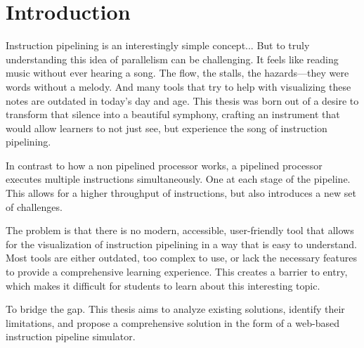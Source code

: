 \chapter{Introduction}


Instruction pipelining is an interestingly simple concept... But to truly understanding this idea of parallelism can be challenging. It feels like reading music without ever hearing a song. The flow, the stalls, the hazards—they were words without a melody. And many tools that try to help with visualizing these notes are outdated in today's day and age.
This thesis was born out of a desire to transform that silence into a beautiful symphony, crafting an instrument that would allow learners to not just see, but experience the song of instruction pipelining.

In contrast to how a non pipelined processor works, a pipelined processor executes multiple instructions simultaneously. One at each stage of the pipeline. This allows for a higher throughput of instructions, but also introduces a new set of challenges.

The problem is that there is no modern, accessible, user-friendly tool that allows for the visualization of instruction pipelining in a way that is easy to understand. Most tools are either outdated, too complex to use, or lack the necessary features to provide a comprehensive learning experience. This creates a barrier to entry, which makes it difficult for students to learn about this interesting topic.

To bridge the gap. This thesis aims to analyze existing solutions, identify their limitations, and propose a comprehensive solution in the form of a web-based instruction pipeline simulator.
